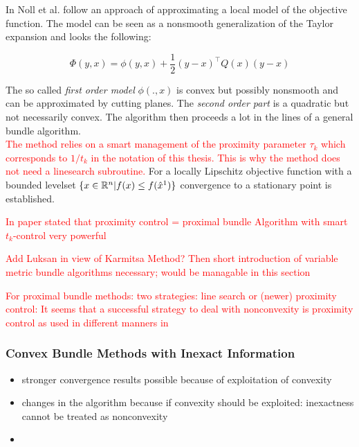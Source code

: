 In \cite{Noll2012} Noll et al. follow an approach of approximating a local model of the objective function. The model can be seen as a nonsmooth generalization of the Taylor expansion and looks the following:

\begin{equation}
	\Phi(y,x) = \phi(y,x)+\frac{1}{2}(y-x)^{\top}Q(x)(y-x)
\label{quad_mod}
\end{equation}

The so called \emph{first order model} \(\phi(.,x)\) is convex but possibly nonsmooth and can be approximated by cutting planes. The \emph{second order part} is a quadratic but not necessarily convex. The algorithm then proceeds a lot in the lines of a general bundle algorithm.\\
\textcolor{red}{The method relies on a smart management of the proximity parameter \(\tau_k\) which corresponds to \(1/t_k\) in the notation of this thesis. This is why the method does not need a linesearch subroutine.}
For a locally Lipschitz objective function with a bounded levelset \(\{x \in \mathbb{R}^n | f(x) \leq f(\hat{x}^1)\}\) convergence to a stationary point is established.

\textcolor{red}{In paper \cite{Noll2012} stated that proximity control = proximal bundle Algorithm with smart \(t_k\)-control very powerful}

\textcolor{red}{Add Luksan in view of Karmitsa Method? Then short introduction of variable metric bundle algorithms necessary; would be managable in this section}

\textcolor{red}{For proximal bundle methods: two strategies: line search or (newer) proximity control: It seems that a successful strategy to deal with nonconvexity is proximity control as used in different manners in \cite{Apkarian2008, Lewis2015, Noll2005, Noll2010, Noll2012, Schramm1992, }}


\subsubsection{Convex Bundle Methods with Inexact Information}

\begin{itemize}
	\item stronger convergence results possible because of exploitation of convexity
	\item changes in the algorithm because if convexity should be exploited: inexactness cannot be treated as nonconvexity
	\item 
\end{itemize}



